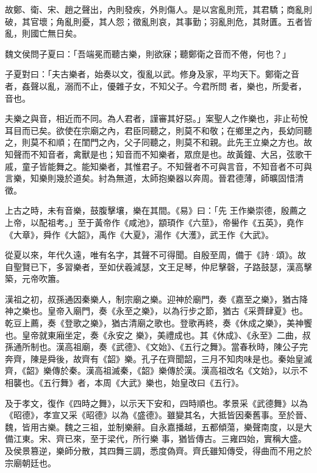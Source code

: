 \begin{pinyinscope}
 故鄭、衛、宋、趙之聲出，內則發疾，外則傷人。是以宮亂則荒，其君驕；商亂則破，其官壞；角亂則憂，其人怨；徵亂則哀，其事勤；羽亂則危，其財匱。五者皆亂，則國亡無日矣。



 魏文侯問子夏曰：「吾端冕而聽古樂，則欲寐；聽鄭衛之音而不倦，何也？」



 子夏對曰：「夫古樂者，始奏以文，復亂以武。修身及家，平均天下。鄭衛之音者，姦聲以亂，溺而不止，優雜子女，不知父子。今君所問
 者，樂也，所愛者，音也。



 夫樂之與音，相近而不同。為人君者，謹審其好惡。」案聖人之作樂也，非止茍悅耳目而已矣。欲使在宗廟之內，君臣同聽之，則莫不和敬；在鄉里之內，長幼同聽之，則莫不和順；在閨門之內，父子同聽之，則莫不和親。此先王立樂之方也。故知聲而不知音者，禽獸是也；知音而不知樂者，眾庶是也。故黃鐘、大呂，弦歌干戚，童子皆能舞之。能知樂者，其惟君子。不知聲者不可與言音，不知音者不可與言樂，知樂則幾於道矣。紂為無道，太師抱樂器以奔周。晉君德薄，師曠固惜清徵。



 上古之時，未有音樂，鼓腹擊壤，樂在其間。《易》曰：「先
 王作樂崇德，殷薦之上帝，以配祖考。」至于黃帝作《咸池》，顓頊作《六莖》，帝嚳作《五英》，堯作《大章》，舜作《大韶》，禹作《大夏》，湯作《大濩》，武王作《大武》。



 從夏以來，年代久遠，唯有名字，其聲不可得聞。自殷至周，備于《詩·頌》。故自聖賢已下，多習樂者，至如伏羲減瑟，文王足琴，仲尼擊磬，子路鼓瑟，漢高擊築，元帝吹簫。



 漢祖之初，叔孫通因秦樂人，制宗廟之樂。迎神於廟門，奏《嘉至之樂》，猶古降神之樂也。皇帝入廟門，奏《永至之樂》，以為行步之節，猶古《采薺肆夏》也。乾豆上薦，奏《登歌之樂》，猶古清廟之歌也。登歌再終，奏《休成之樂》，美神饗也。皇帝就東廂坐定，奏《永安之
 樂》，美禮成也。其《休成》、《永至》二曲，叔孫通所制也。漢高祖廟，奏《武德》、《文始》、《五行之舞》。當春秋時，陳公子完奔齊，陳是舜後，故齊有《韶》樂。孔子在齊聞韶，三月不知肉味是也。秦始皇滅齊，《韶》樂傳於秦。漢高祖滅秦，《韶》樂傳於漢。漢高祖改名《文始》，以示不相襲也。《五行舞》者，本周《大武》樂也，始皇改曰《五行》。



 及于孝文，復作《四時之舞》，以示天下安和，四時順也。孝景采《武德舞》以為《昭德》，孝宣又采《昭德》以為《盛德》。雖變其名，大抵皆因秦舊事。至於晉、魏，皆用古樂。魏之三祖，並制樂辭。自永嘉播越，五都傾蕩，樂聲南度，以是大備江東。宋、齊已來，至于梁代，所行樂
 事，猶皆傳古。三雍四始，實稱大盛。及侯景篡逆，樂師分散，其四舞三調，悉度偽齊。齊氏雖知傳受，得曲而不用之於宗廟朝廷也。




\end{pinyinscope}
